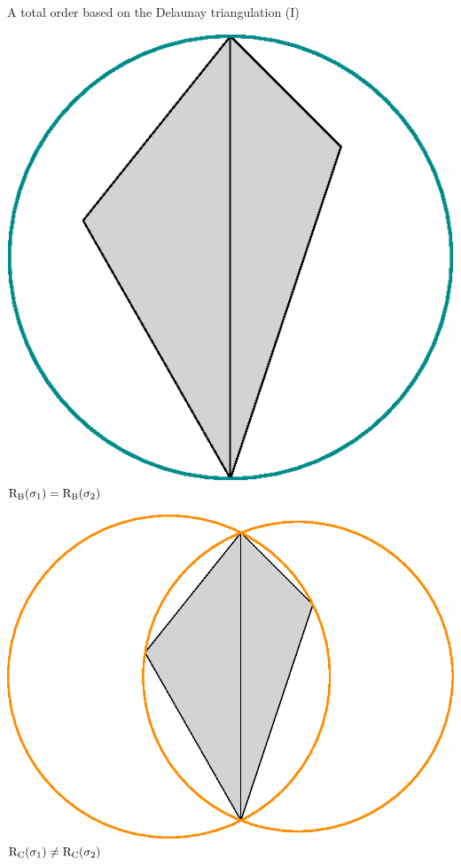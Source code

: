 \begin{frame}[c]{A total order based on the Delaunay triangulation (I)}
	\begin{center}
		\begin{minipage}{0.5\linewidth}
			\centering
			\includegraphics[height=0.3\textheight]{order_rseb}\\
			\color{pathblue}$\operatorname{R_B}(\sigma_1) = \operatorname{R_B}(\sigma_2)$	
		\end{minipage}%
		\begin{minipage}{0.5\linewidth}
			\centering
			\includegraphics[height=0.3\textheight]{order_rcirc}\\
			\color{pathorange} $\operatorname{R_C}(\sigma_1) \neq \operatorname{R_C}(\sigma_2)$
		\end{minipage}%
	\end{center}
\end{frame}

